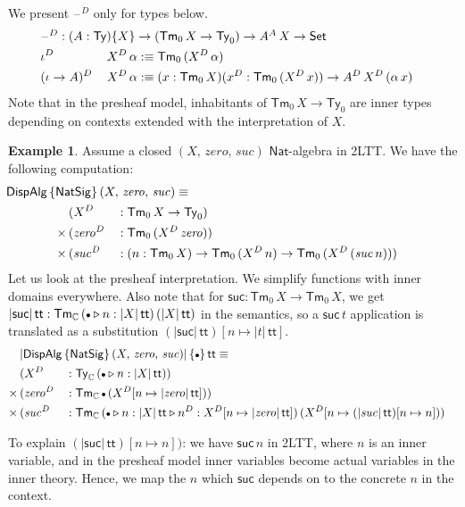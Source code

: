 \documentclass[12pt,a4paper,twoside,openany]{book}
\theoremstyle{remark}
\theoremstyle{definition}
\newtheorem{myexample}{Example}
\theoremstyle{theorem}
\newcommand{\mi}[1]{\mathit{#1}}
\newcommand{\ms}[1]{\mathsf{#1}}
\newcommand{\mbb}[1]{\mathbb{#1}}
\newcommand{\Tm}{\mathsf{Tm}}
\newcommand{\Ty}{\mathsf{Ty}}
\renewcommand{\tt}{\mathsf{tt}}
\newcommand{\blank}{\mathord{\hspace{1pt}\text{--}\hspace{1pt}}}
\newcommand{\Set}{\mathsf{Set}}
\newcommand{\ext}{\triangleright}
\newcommand{\emptycon}{\scaleobj{.75}\bullet}
\newcommand{\DispAlg}{\ms{DispAlg}}
\newcommand{\Nat}{\ms{Nat}}
\newcommand{\mbbC}{\mbb{C}}
\newcommand{\defn}{:\equiv}
\begin{document}
We present $\blank^D$ only for types below.
\begin{alignat*}{3}
  & \rlap{$\blank^D : (A : \Ty)\{X\} \to (\Tm_0\,X \to \Ty_0) \to A^A\,X \to \Set$}\\
  & \iota^D\,       && X^D\,\alpha \defn \Tm_0\,(X^D\,\alpha) \\
  & (\iota\to A)^D\,&& X^D\,\alpha \defn (x : \Tm_0\,X)(x^D : \Tm_0\,(X^D\,x)) \to A^D\,X^D\,(\alpha\,x)
\end{alignat*}
Note that in the presheaf model, inhabitants of $\Tm_0\,X \to \Ty_0$ are inner types
depending on contexts extended with the interpretation of $X$.
\begin{myexample} Assume a closed $(X,\,\mi{zero},\,\mi{suc})$ $\Nat$-algebra in 2LTT. We have the following computation:
\begin{alignat*}{3}
  & \hspace{-5em}\rlap{$\DispAlg\,\{\ms{NatSig}\}\,(X,\,\mi{zero},\,\mi{suc}) \equiv$}\\
              & (X^D &&: \Tm_0\,X \to \Ty_0)\\
      \times\,& (\mi{zero^D} &&: \Tm_0\,(X^D\,\mi{zero}))\\
      \times\,& (\mi{suc^D} &&: (n : \Tm_0\,X) \to \Tm_0\,(X^D\,n) \to \Tm_0\,(X^D\,(\mi{suc}\,n)))
\end{alignat*}
Let us look at the presheaf interpretation. We simplify functions with inner
domains everywhere. Also note that for $\ms{suc} : \Tm_0\,X \to \Tm_0\,X$, we
get $|\ms{suc}|\,\tt : \Tm_{\mbbC}\,(\emptycon\ext n : |X|\,\tt)\,(|X|\,\tt)$ in
the semantics, so a $\ms{suc}\,t$ application is translated as a substitution
$(|\ms{suc}|\,\tt)[n \mapsto |t|\,\tt]$.
\begin{alignat*}{3}
  & \rlap{$|\DispAlg\,\{\ms{NatSig}\}\,(X,\,\mi{zero},\,\mi{suc})|\,\{\emptycon\}\,\tt \equiv$}\\
              & (X^D &&: \Ty_{\mbbC}\,(\emptycon\ext n : |X|\,\tt))\\
      \times\,& (\mi{zero^D} &&: \Tm_{\mbbC}\,\emptycon\,(X^D[n \mapsto |\mi{zero}|\,\tt]))\\
      \times\,& (\mi{suc^D} &&: \Tm_{\mbbC}\,(\emptycon\ext n : |X|\,\tt \ext n^D : X^D[n \mapsto |\mi{zero}|\,\tt])\,(X^D[n \mapsto (|\mi{suc}|\,\tt)[n \mapsto n]))
\end{alignat*}
\end{myexample}
To explain $(|\ms{suc}|\,\tt)[n \mapsto n])$: we have $\ms{suc}\,n$ in 2LTT,
where $n$ is an inner variable, and in the presheaf model inner variables become
actual variables in the inner theory. Hence, we map the $n$ which $\ms{suc}$
depends on to the concrete $n$ in the context.
\end{document}
